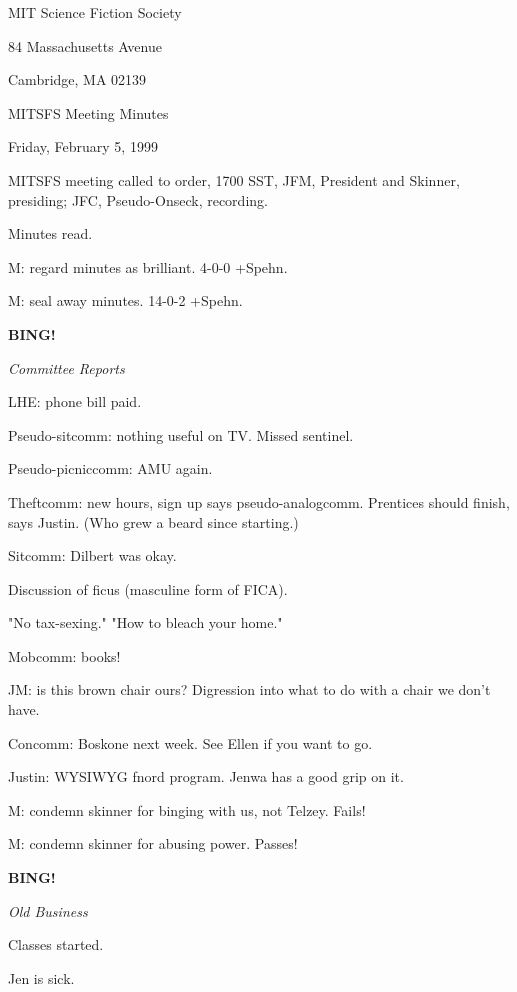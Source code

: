 \documentclass[12pt]{article}
\newcommand{\bing}{{\bf BING!} }
\newcommand{\goto}[1]{\bing \vskip 12pt \centerline{{\em{#1}}}}
\begin{document}
\begin{center}

MIT Science Fiction Society 

84 Massachusetts Avenue

Cambridge, MA 02139

\vspace{12pt}

MITSFS Meeting Minutes 

Friday, February 5, 1999

\end{center}
 
\vspace{18pt}

\setlength{\parskip}{6pt}

\noindent
MITSFS meeting called to order, 1700 SST,
JFM, President and Skinner, presiding; JFC, Pseudo-Onseck, recording.

Minutes read.

M: regard minutes as brilliant. 4-0-0 +Spehn.

M: seal away minutes. 14-0-2 +Spehn.

\goto{Committee Reports}

LHE: phone bill paid.

Pseudo-sitcomm: nothing useful on TV. Missed sentinel.

Pseudo-picniccomm: AMU again.

Theftcomm: new hours, sign up says pseudo-analogcomm. Prentices should finish, says Justin. (Who grew a beard since starting.)

Sitcomm: Dilbert was okay.

Discussion of ficus (masculine form of FICA).

"No tax-sexing." "How to bleach your home."

Mobcomm: books!

JM: is this brown chair ours? Digression into what to do with a chair we don't have.

Concomm: Boskone next week. See Ellen if you want to go.

Justin: WYSIWYG fnord program. Jenwa has a good grip on it.

M: condemn skinner for binging with us, not Telzey. Fails!

M: condemn skinner for abusing power. Passes!

\goto{Old Business}

Classes started.

Jen is sick.
\end{document}
